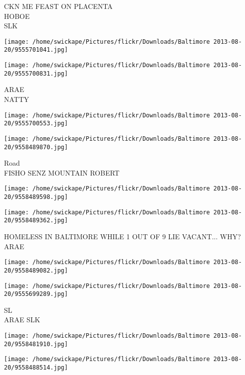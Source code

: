 \documentclass[10pt,letterpaper]{article}
\begin{document}
CKN ME FEAST ON PLACENTA\\
HOBOE\\
SLK\\
\pagebreak

\texttt{[image: /home/swickape/Pictures/flickr/Downloads/Baltimore 2013-08-20/9555701041.jpg]}

\vspace{0.25in}
\texttt{[image: /home/swickape/Pictures/flickr/Downloads/Baltimore 2013-08-20/9555700831.jpg]}

ARAE\\
NATTY\\
\pagebreak

\texttt{[image: /home/swickape/Pictures/flickr/Downloads/Baltimore 2013-08-20/9555700553.jpg]}

\vspace{0.25in}
\texttt{[image: /home/swickape/Pictures/flickr/Downloads/Baltimore 2013-08-20/9558489870.jpg]}

Road\\
FISHO SENZ MOUNTAIN ROBERT\\
\pagebreak

\texttt{[image: /home/swickape/Pictures/flickr/Downloads/Baltimore 2013-08-20/9558489598.jpg]}

\vspace{0.25in}
\texttt{[image: /home/swickape/Pictures/flickr/Downloads/Baltimore 2013-08-20/9558489362.jpg]}

HOMELESS IN BALTIMORE WHILE 1 OUT OF 9 LIE VACANT... WHY?\\
ARAE\\
\pagebreak

\texttt{[image: /home/swickape/Pictures/flickr/Downloads/Baltimore 2013-08-20/9558489082.jpg]}

\vspace{0.25in}
\texttt{[image: /home/swickape/Pictures/flickr/Downloads/Baltimore 2013-08-20/9555699289.jpg]}

SL\\
ARAE SLK\\
\pagebreak

\texttt{[image: /home/swickape/Pictures/flickr/Downloads/Baltimore 2013-08-20/9558481910.jpg]}

\vspace{0.25in}
\texttt{[image: /home/swickape/Pictures/flickr/Downloads/Baltimore 2013-08-20/9558488514.jpg]}
\end{document}

